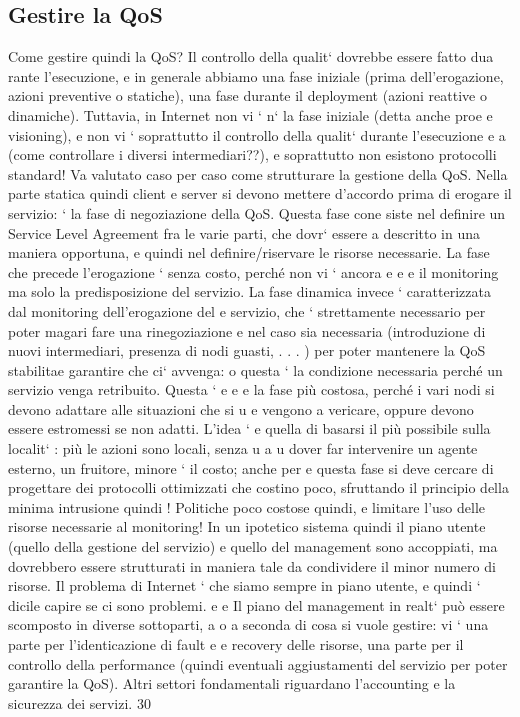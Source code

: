 \documentclass[a4paper,12pt]{article}
\begin{document}
\subsection{Gestire la QoS}
Come gestire quindi la QoS? Il controllo della qualit` dovrebbe essere fatto dua
rante l'esecuzione, e in generale abbiamo una fase iniziale (prima dell'erogazione,
azioni preventive o statiche), una fase durante il deployment (azioni reattive o
dinamiche). Tuttavia, in Internet non vi ` n` la fase iniziale (detta anche proe e
visioning), e non vi ` soprattutto il controllo della qualit` durante l'esecuzione
e
a
(come controllare i diversi intermediari??), e soprattutto non esistono protocolli
standard! Va valutato caso per caso come strutturare la gestione della QoS.
Nella parte statica quindi client e server si devono mettere d'accordo prima
di erogare il servizio: ` la fase di negoziazione della QoS. Questa fase cone
siste nel definire un Service Level Agreement fra le varie parti, che dovr` essere
a
descritto in una maniera opportuna, e quindi nel definire/riservare le risorse necessarie. La fase che precede
l'erogazione ` senza costo, perché non vi ` ancora
e
e
e
il monitoring ma solo la predisposizione del servizio.
La fase dinamica invece ` caratterizzata dal monitoring dell'erogazione del
e
servizio, che ` strettamente necessario per poter magari fare una rinegoziazione
e
nel caso sia necessaria (introduzione di nuovi intermediari, presenza di nodi
guasti, . . . ) per poter mantenere la QoS stabilitae garantire che ci` avvenga:
o
questa ` la condizione necessaria perché un servizio venga retribuito. Questa `
e
e
e
la fase più costosa, perché i vari nodi si devono adattare alle situazioni che si
u
e
vengono a vericare, oppure devono essere estromessi se non adatti. L'idea `
e
quella di basarsi il più possibile sulla localit` : più le azioni sono locali, senza
u
a
u
dover far intervenire un agente esterno, un fruitore, minore ` il costo; anche per
e
questa fase si deve cercare di progettare dei protocolli ottimizzati che costino
poco, sfruttando il principio della minima intrusione quindi ! Politiche poco
costose quindi, e limitare l'uso delle risorse necessarie al monitoring! In un
ipotetico sistema quindi il piano utente (quello della gestione del servizio) e
quello del management sono accoppiati, ma dovrebbero essere strutturati in
maniera tale da condividere il minor numero di risorse. Il problema di Internet
` che siamo sempre in piano utente, e quindi ` dicile capire se ci sono problemi.
e
e
Il piano del management in realt` può essere scomposto in diverse sottoparti,
a o
a seconda di cosa si vuole gestire: vi ` una parte per l'identicazione di fault
e
e recovery delle risorse, una parte per il controllo della performance (quindi
eventuali aggiustamenti del servizio per poter garantire la QoS). Altri settori
fondamentali riguardano l'accounting e la sicurezza dei servizi.
30
\end{document}
